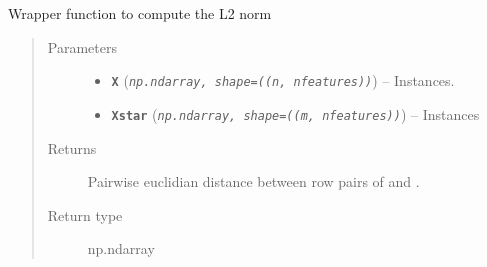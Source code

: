 \documentclass[letterpaper,10pt,english]{sphinxmanual}
\begin{document}
\begin{fulllineitems}
\label{pyGPGO.covfunc:pyGPGO.covfunc.l2norm_}
Wrapper function to compute the L2 norm
\begin{quote}\begin{description}
\item[{Parameters}] \leavevmode\begin{itemize}
\item {} 
\textbf{\texttt{X}} (\emph{\texttt{np.ndarray, shape=((n, nfeatures))}}) -- Instances.

\item {} 
\textbf{\texttt{Xstar}} (\emph{\texttt{np.ndarray, shape=((m, nfeatures))}}) -- Instances

\end{itemize}

\item[{Returns}] \leavevmode
Pairwise euclidian distance between row pairs of  and .

\item[{Return type}] \leavevmode
np.ndarray

\end{description}\end{quote}

\end{fulllineitems}

\end{document}
